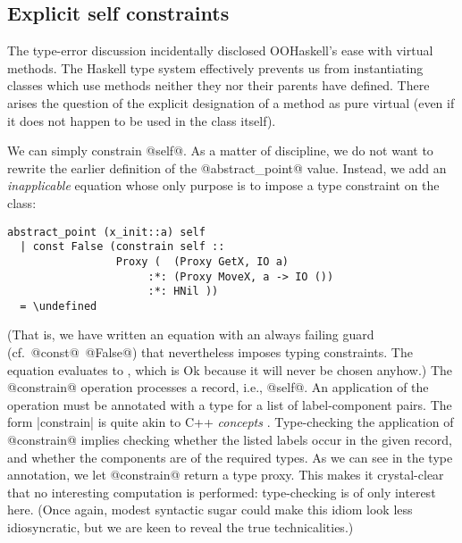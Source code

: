 


\medskip

\subsection{Explicit self constraints}

The type-error discussion incidentally disclosed OOHaskell's ease with
virtual methods. The Haskell type system effectively prevents us from
instantiating classes which use methods neither they nor their parents
have defined. There arises the question of the explicit designation of
a method as pure virtual (even if it does not happen to be used in
the class itself).

We can simply constrain @self@. As a matter of discipline, we do not
want to rewrite the earlier definition of the @abstract_point@ value.
Instead, we add an \emph{inapplicable} equation whose only purpose
is to impose a type constraint on the class:

\begin{Verbatim}[fontsize=\small,commandchars=\\\{\}]
 abstract_point (x_init::a) self 
  | const False (constrain self ::
                 Proxy (  (Proxy GetX, IO a)
                      :*: (Proxy MoveX, a -> IO ())
                      :*: HNil ))
  = \undefined
\end{Verbatim}

\noindent
(That is, we have written an equation with an always failing guard
(cf.\ @const@~@False@) that nevertheless imposes typing constraints.
The equation evaluates to \undefined, which is Ok because it will
never be chosen anyhow.) The @constrain@ operation processes a record,
i.e., @self@. An application of the operation must be
annotated with a type for a list of label-component pairs.  The form
|constrain| is quite akin to C++ \emph{concepts}
\cite{siek05:_concepts_cpp0x}. Type-checking the application of
@constrain@ implies checking whether the listed labels occur in the
given record, and whether the components are of the required types.
As we can see in the type annotation, we let @constrain@ return a type
proxy. This makes it crystal-clear that no interesting computation is
performed: type-checking is of only interest here. (Once again, modest
syntactic sugar could make this idiom look less idiosyncratic, but we
are keen to reveal the true technicalities.)

